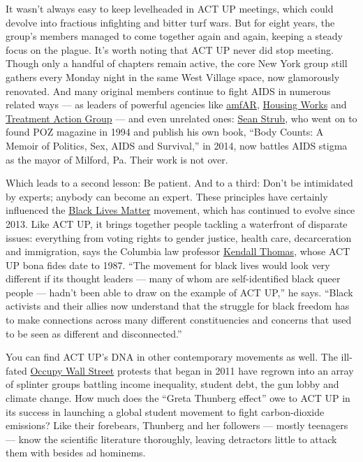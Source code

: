 It wasn't always easy to keep levelheaded in ACT UP meetings, which
could devolve into fractious infighting and bitter turf wars. But for
eight years, the group's members managed to come together again and
again, keeping a steady focus on the plague. It's worth noting that ACT
UP never did stop meeting. Though only a handful of chapters remain
active, the core New York group still gathers every Monday night in the
same West Village space, now glamorously renovated. And many original
members continue to fight AIDS in numerous related ways --- as leaders
of powerful agencies like \href{https://www.amfar.org/}{amfAR},
\href{https://www.housingworks.org/}{Housing Works} and
\href{https://www.treatmentactiongroup.org/}{Treatment Action Group} ---
and even unrelated ones: \href{http://www.seanstrub.com/}{Sean Strub},
who went on to found POZ magazine in 1994 and publish his own book,
``Body Counts: A Memoir of Politics, Sex, AIDS and Survival,'' in 2014,
now battles AIDS stigma as the mayor of Milford, Pa. Their work is not
over.

Which leads to a second lesson: Be patient. And to a third: Don't be
intimidated by experts; anybody can become an expert. These principles
have certainly influenced the
\href{https://www.nytimes3xbfgragh.onion/2018/03/28/insider/black-lives-matter-stress.html}{Black
Lives Matter} movement, which has continued to evolve since 2013. Like
ACT UP, it brings together people tackling a waterfront of disparate
issues: everything from voting rights to gender justice, health care,
decarceration and immigration, says the Columbia law professor
\href{https://www.law.columbia.edu/faculty/kendall-thomas}{Kendall
Thomas}, whose ACT UP bona fides date to 1987. ``The movement for black
lives would look very different if its thought leaders --- many of whom
are self-identified black queer people --- hadn't been able to draw on
the example of ACT UP,'' he says. ``Black activists and their allies now
understand that the struggle for black freedom has to make connections
across many different constituencies and concerns that used to be seen
as different and disconnected.''

You can find ACT UP's DNA in other contemporary movements as well. The
ill-fated
\href{https://www.nytimes3xbfgragh.onion/topic/organization/occupy-movement-occupy-wall-street}{Occupy
Wall Street} protests that began in 2011 have regrown into an array of
splinter groups battling income inequality, student debt, the gun lobby
and climate change. How much does the ``Greta Thunberg effect'' owe to
ACT UP in its success in launching a global student movement to fight
carbon-dioxide emissions? Like their forebears, Thunberg and her
followers --- mostly teenagers --- know the scientific literature
thoroughly, leaving detractors little to attack them with besides ad
hominems.

